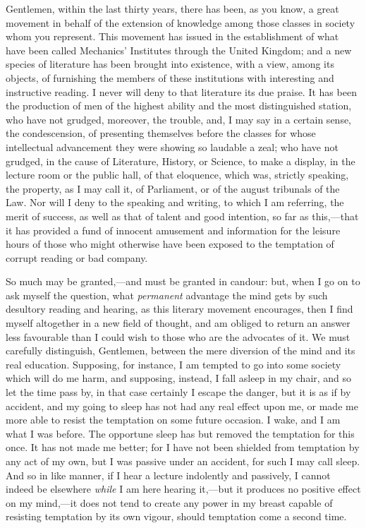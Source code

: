 Gentlemen, within the last thirty years, there has been, as you
know, a great movement in behalf of the extension of knowledge among
those classes in society whom you represent. This movement has issued
in the establishment of what have been called Mechanics' Institutes
through the United Kingdom; and a new species of literature has been
brought into existence, with a view, among its objects, of furnishing
the members of these institutions with interesting and instructive
reading. I never will deny to that literature its due praise. It has
been the production of men of the highest ability and the most
distinguished station, who have not grudged, moreover, the trouble,
and, I may say in a certain sense, the condescension, of presenting
themselves before the classes for whose intellectual advancement they
were showing so laudable a zeal; who have not grudged, in the cause of
Literature, History, or Science, to make a display, in the lecture
room or the public hall, of that eloquence, which was, strictly
speaking, the property, as I may call it, of Parliament, or of the
august tribunals of the Law. Nor will I deny to the speaking and
writing, to which I am referring, the merit of success, as well as
that of talent and good intention, so far as this,—that it has
provided a fund of innocent amusement and information for the leisure
hours of those who might otherwise have been exposed to the temptation
of corrupt reading or bad company.

So much may be granted,—and must be granted in candour: but, when
I go on to ask myself the question, what \emph{permanent} advantage
the mind gets by such desultory reading and hearing, as this literary
movement encourages, then I find myself altogether in a new field of
thought, and am obliged to return an answer less favourable than I
could wish to those who are the advocates of it. We must carefully
distinguish, Gentlemen, between the mere diversion of the mind and its
real education. Supposing, for instance, I am tempted to go into some
society which will do me harm, and supposing, instead, I fall asleep
in my chair, and so let the time pass by, in that case certainly I
escape the danger, but it is as if by accident, and my going to sleep
has not had any real effect upon me, or made me more able to resist
the temptation on some future occasion. I wake, and I am what I was
before. The opportune sleep has but removed the temptation for this
once. It has not made me better; for I have not been shielded from
temptation by any act of my own, but I was passive under an accident,
for such I may call sleep. And so in like manner, if I hear a lecture
indolently and passively, I cannot indeed be elsewhere \emph{while} I
am here hearing it,—but it produces no positive effect on my mind,—it
does not tend to create any power in my breast capable of resisting
temptation by its own vigour, should temptation come a second time.

